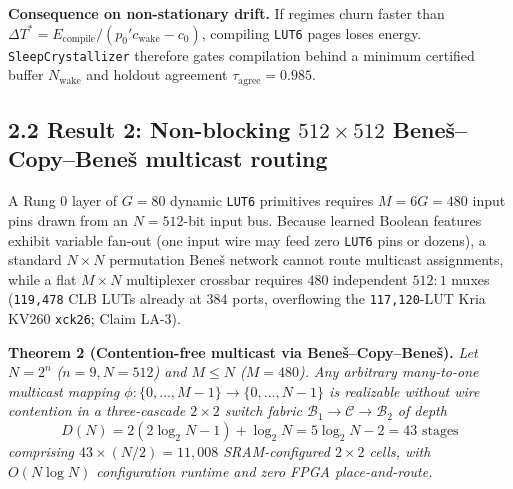 \documentclass[10pt]{article}
\begin{document}
\textbf{Consequence on non-stationary drift.} If regimes churn faster than $\Delta T^* = E_{\text{compile}} / (p_0' c_{\text{wake}} - c_0)$, compiling \texttt{LUT6} pages loses energy. \texttt{SleepCrystallizer} therefore gates compilation behind a minimum certified buffer $N_{\text{wake}}$ and holdout agreement $\tau_{\text{agree}} = 0.985$.

\subsection{2.2 Result 2: Non-blocking \texorpdfstring{$512 \times 512$}{512x512} Bene\v{s}--Copy--Bene\v{s} multicast routing}\label{result-2}

A Rung 0 layer of $G = 80$ dynamic \texttt{LUT6} primitives requires $M = 6G = 480$ input pins drawn from an $N = 512$-bit input bus. Because learned Boolean features exhibit variable fan-out (one input wire may feed zero \texttt{LUT6} pins or dozens), a standard $N \times N$ permutation Bene\v{s} network cannot route multicast assignments, while a flat $M \times N$ multiplexer crossbar requires $480$ independent $512:1$ muxes (\texttt{119,478} CLB LUTs already at $384$ ports, overflowing the \texttt{117,120}-LUT Kria KV260 \texttt{xck26}; Claim LA-3).

\textbf{Theorem 2 (Contention-free multicast via Bene\v{s}--Copy--Bene\v{s}).} \emph{Let $N = 2^n$ ($n=9, N=512$) and $M \le N$ ($M=480$). Any arbitrary many-to-one multicast mapping $\phi: \{0, \dots, M-1\} \to \{0, \dots, N-1\}$ is realizable without wire contention in a three-cascade $2 \times 2$ switch fabric $\mathcal{B}_1 \to \mathcal{C} \to \mathcal{B}_2$ of depth}
\[
  D(N) = 2(2\log_2 N - 1) + \log_2 N = 5\log_2 N - 2 = 43 \text{ stages}
\]
\emph{comprising $43 \times (N/2) = 11{,}008$ SRAM-configured $2 \times 2$ cells, with $O(N \log N)$ configuration runtime and zero FPGA place-and-route.}
\end{document}
